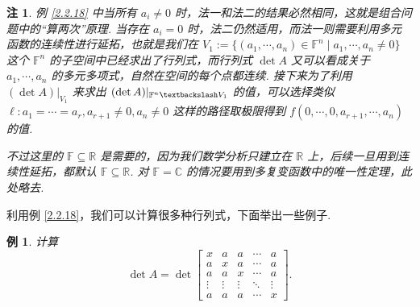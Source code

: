 \documentclass[10pt,openany]{article}
\theoremstyle{thmstyle} %
\theoremstyle{defstyle} %
\theoremstyle{prostyle} %
\theoremstyle{exastyle}
\newtheorem{example}[theorem]{例}
\theoremstyle{remstyle}
\newtheorem{remark}[theorem]{注}
\newcommand{\F}{\mathbb{F}}
\newcommand{\C}{\mathbb{C}}
\begin{document}
\begin{remark} \label{2.2.19}
	例 \ref{2.2.18} 中当所有 \( a_i \neq 0 \) 时，法一和法二的结果必然相同，这就是组合问题中的“算两次”原理. 当存在 \( a_i =0 \) 时，法二仍然适用，而法一则需要利用多元函数的连续性进行延拓，也就是我们在 \( V_1:=\{ (a_1,\cdots,a_n) \in \F^n \mid a_1,\cdots,a_n \neq 0 \} \) 这个 \( \F^n \) 的子空间中已经求出了行列式，而行列式 \( \det A \) 又可以看成关于 \( a_1,\cdots,a_n \) 的多元多项式，自然在空间的每个点都连续. 接下来为了利用 \( (\det A)|_{V_1} \) 来求出 \( (\det A)|_{\mathbb{F}^n\textbackslash V_1} \) 的值，可以选择类似 \( \ell: a_1=\cdots=a_r, a_{r+1} \neq 0, a_n \neq 0 \) 这样的路径取极限得到 \( f(0,\cdots,0,a_{r+1},\cdots,a_n) \) 的值. 
	
	不过这里的 \( \F \subseteq \mathbb{R} \) 是需要的，因为我们数学分析只建立在 \( \mathbb{R} \) 上，后续一旦用到连续性延拓，都默认 \( \F \subseteq \mathbb{R} \). 对 \( \F =\C \) 的情况要用到多复变函数中的唯一性定理，此处略去.
\end{remark}

利用例 \ref{2.2.18}，我们可以计算很多种行列式，下面举出一些例子.

\begin{example}	\label{2.2.20}
	计算 \[
	\det A= \det \begin{bmatrix}
		x & a & a & \cdots & a \\
		a & x & a & \cdots & a \\
		a & a & x & \cdots & a \\
		\vdots & \vdots & \vdots & \ddots & \vdots \\
		a & a & a & \cdots & x
	\end{bmatrix}.
	\]

\end{example}
\end{document}
